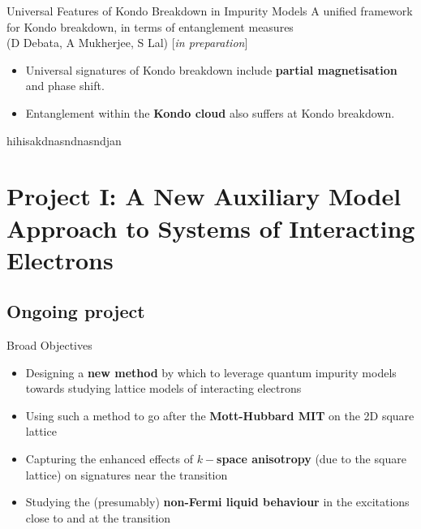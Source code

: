 \documentclass[12pt,aspectratio=169]{beamer}
\newcommand\focus[1]{%
	{\alert{\textbf{#1}}}
}
\begin{document}
\begin{frame}{Universal Features of Kondo Breakdown in Impurity Models}
\flushleft
A unified framework for Kondo breakdown, in terms of entanglement measures\\
(D Debata, A Mukherjee, S Lal) [{\it in preparation}]\\[10pt]

\begin{minipage}{0.55\textwidth}
\begin{itemize}
	\item Universal signatures of Kondo breakdown include \focus{partial magnetisation} and phase shift.
	\item Entanglement within the \focus{Kondo cloud} also suffers at Kondo breakdown.
\end{itemize}
\end{minipage}
\begin{minipage}{0.4\textwidth}
	hihisakdnasndnasndjan
\end{minipage}
\end{frame}
	
\section{Project I: A New Auxiliary Model Approach to Systems of Interacting Electrons}
\subsection{Ongoing project}

\begin{frame}{Broad Objectives}

\begin{itemize}
	\item Designing a \focus{new method} by which to leverage quantum impurity models towards studying lattice models of interacting electrons\\[10pt]
	\item Using such a method to go after the \focus{Mott-Hubbard MIT} on the 2D square lattice\\[10pt]
	\item Capturing the enhanced effects of \focus{\(k-\)space anisotropy} (due to the square lattice) on signatures near the transition\\[10pt]
	\item Studying the (presumably) \focus{non-Fermi liquid behaviour} in the excitations close to and at the transition
\end{itemize}

\end{frame}
\end{document}

